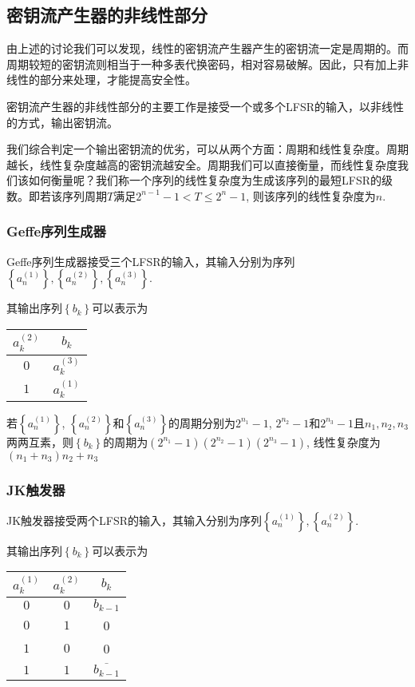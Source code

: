 \documentclass[UTF8]{ctexrep}
\def\pth#1{\left( {#1}\right)}
\def\brace#1{\left\{ {#1} \right\}}
\begin{document}
\subsection{密钥流产生器的非线性部分}
由上述的讨论我们可以发现，线性的密钥流产生器产生的密钥流一定是周期的。而周期较短的密钥流则相当于一种多表代换密码，相对容易破解。因此，只有加上非线性的部分来处理，才能提高安全性。\par
密钥流产生器的非线性部分的主要工作是接受一个或多个LFSR的输入，以非线性的方式，输出密钥流。\par
我们综合判定一个输出密钥流的优劣，可以从两个方面：周期和线性复杂度。周期越长，线性复杂度越高的密钥流越安全。周期我们可以直接衡量，而线性复杂度我们该如何衡量呢？我们称一个序列的线性复杂度为生成该序列的最短LFSR的级数。即若该序列周期$T$满足$2^{n-1}-1<T\leq 2^{n}-1$, 则该序列的线性复杂度为$n$.
\subsubsection{Geffe序列生成器}
Geffe序列生成器接受三个LFSR的输入，其输入分别为序列$\brace{a_n^{(1)}}, \brace{a_n^{(2)}}, \brace{a_n^{(3)}}$.\par
其输出序列$\brace{b_k}$可以表示为
\begin{table}[H]
    \centering
    \begin{tabular}{c|c}\hline
        $a_k^{(2)}$&$b_k$\\\hline
        $0$&$a_k^{(3)}$\\\hline
        $1$&$a_k^{(1)}$\\\hline
    \end{tabular}
\end{table}

若$\brace{a_n^{(1)}}$, $\brace{a_n^{(2)}}$和$\brace{a_n^{(3)}}$的周期分别为$2^{n_1}-1$, $2^{n_2}-1$和$2^{n_3}-1$且$n_1, n_2, n_3$两两互素，则$\brace{b_k}$的周期为$\pth{2^{n_1}-1}\pth{2^{n_2}-1}\pth{2^{n_3}-1}$, 线性复杂度为$\pth{n_1+n_3}n_2+n_3$
\subsubsection{JK触发器}
JK触发器接受两个LFSR的输入，其输入分别为序列$\brace{a_n^{(1)}}, \brace{a_n^{(2)}}$.\par
其输出序列$\brace{b_k}$可以表示为
\begin{table}[H]
    \centering
    \begin{tabular}{c|c|c}\hline
        $a_k^{(1)}$&$a_k^{(2)}$&$b_k$\\\hline
        $0$&$0$&$b_{k-1}$\\\hline
        $0$&$1$&0\\\hline
        $1$&$0$&0\\\hline
        $1$&$1$&$\overline{b_{k-1}}$\\\hline
    \end{tabular}
\end{table}
\end{document}
